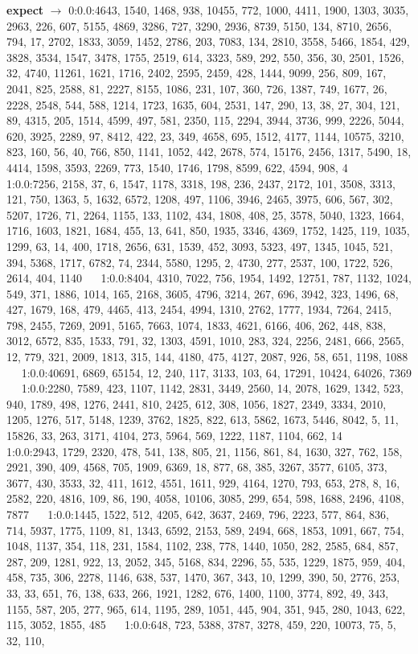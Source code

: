 \documentclass[a4paper,11pt,oneside]{book}
\begin{document}
\textbf{expect} $\rightarrow$	0:0.0:4643, 1540, 1468, 938, 10455, 772, 1000, 4411, 1900, 1303, 3035, 2963, 226, 607, 5155, 4869, 3286, 727, 3290, 2936, 8739, 5150, 134, 8710, 2656, 794, 17, 2702, 1833, 3059, 1452, 2786, 203, 7083, 134, 2810, 3558, 5466, 1854, 429, 3828, 3534, 1547, 3478, 1755, 2519, 614, 3323, 589, 292, 550, 356, 30, 2501, 1526, 32, 4740, 11261, 1621, 1716, 2402, 2595, 2459, 428, 1444, 9099, 256, 809, 167, 2041, 825, 2588, 81, 2227, 8155, 1086, 231, 107, 360, 726, 1387, 749, 1677, 26, 2228, 2548, 544, 588, 1214, 1723, 1635, 604, 2531, 147, 290, 13, 38, 27, 304, 121, 89, 4315, 205, 1514, 4599, 497, 581, 2350, 115, 2294, 3944, 3736, 999, 2226, 5044, 620, 3925, 2289, 97, 8412, 422, 23, 349, 4658, 695, 1512, 4177, 1144, 10575, 3210, 823, 160, 56, 40, 766, 850, 1141, 1052, 442, 2678, 574, 15176, 2456, 1317, 5490, 18, 4414, 1598, 3593, 2269, 773, 1540, 1746, 1798, 8599, 622, 4594, 908, 4	$\quad$	1:0.0:7256, 2158, 37, 6, 1547, 1178, 3318, 198, 236, 2437, 2172, 101, 3508, 3313, 121, 750, 1363, 5, 1632, 6572, 1208, 497, 1106, 3946, 2465, 3975, 606, 567, 302, 5207, 1726, 71, 2264, 1155, 133, 1102, 434, 1808, 408, 25, 3578, 5040, 1323, 1664, 1716, 1603, 1821, 1684, 455, 13, 641, 850, 1935, 3346, 4369, 1752, 1425, 119, 1035, 1299, 63, 14, 400, 1718, 2656, 631, 1539, 452, 3093, 5323, 497, 1345, 1045, 521, 394, 5368, 1717, 6782, 74, 2344, 5580, 1295, 2, 4730, 277, 2537, 100, 1722, 526, 2614, 404, 1140	$\quad$	1:0.0:8404, 4310, 7022, 756, 1954, 1492, 12751, 787, 1132, 1024, 549, 371, 1886, 1014, 165, 2168, 3605, 4796, 3214, 267, 696, 3942, 323, 1496, 68, 427, 1679, 168, 479, 4465, 413, 2454, 4994, 1310, 2762, 1777, 1934, 7264, 2415, 798, 2455, 7269, 2091, 5165, 7663, 1074, 1833, 4621, 6166, 406, 262, 448, 838, 3012, 6572, 835, 1533, 791, 32, 1303, 4591, 1010, 283, 324, 2256, 2481, 666, 2565, 12, 779, 321, 2009, 1813, 315, 144, 4180, 475, 4127, 2087, 926, 58, 651, 1198, 1088	$\quad$	1:0.0:40691, 6869, 65154, 12, 240, 117, 3133, 103, 64, 17291, 10424, 64026, 7369	$\quad$	1:0.0:2280, 7589, 423, 1107, 1142, 2831, 3449, 2560, 14, 2078, 1629, 1342, 523, 940, 1789, 498, 1276, 2441, 810, 2425, 612, 308, 1056, 1827, 2349, 3334, 2010, 1205, 1276, 517, 5148, 1239, 3762, 1825, 822, 613, 5862, 1673, 5446, 8042, 5, 11, 15826, 33, 263, 3171, 4104, 273, 5964, 569, 1222, 1187, 1104, 662, 14	$\quad$	1:0.0:2943, 1729, 2320, 478, 541, 138, 805, 21, 1156, 861, 84, 1630, 327, 762, 158, 2921, 390, 409, 4568, 705, 1909, 6369, 18, 877, 68, 385, 3267, 3577, 6105, 373, 3677, 430, 3533, 32, 411, 1612, 4551, 1611, 929, 4164, 1270, 793, 653, 278, 8, 16, 2582, 220, 4816, 109, 86, 190, 4058, 10106, 3085, 299, 654, 598, 1688, 2496, 4108, 7877	$\quad$	1:0.0:1445, 1522, 512, 4205, 642, 3637, 2469, 796, 2223, 577, 864, 836, 714, 5937, 1775, 1109, 81, 1343, 6592, 2153, 589, 2494, 668, 1853, 1091, 667, 754, 1048, 1137, 354, 118, 231, 1584, 1102, 238, 778, 1440, 1050, 282, 2585, 684, 857, 287, 209, 1281, 922, 13, 2052, 345, 5168, 834, 2296, 55, 535, 1229, 1875, 959, 404, 458, 735, 306, 2278, 1146, 638, 537, 1470, 367, 343, 10, 1299, 390, 50, 2776, 253, 33, 33, 651, 76, 138, 633, 266, 1921, 1282, 676, 1400, 1100, 3774, 892, 49, 343, 1155, 587, 205, 277, 965, 614, 1195, 289, 1051, 445, 904, 351, 945, 280, 1043, 622, 115, 3052, 1855, 485	$\quad$	1:0.0:648, 723, 5388, 3787, 3278, 459, 220, 10073, 75, 5, 32, 110, 
\end{document}
